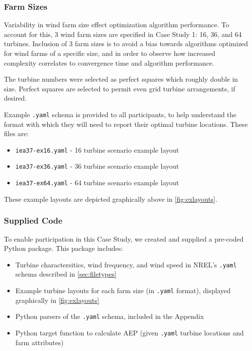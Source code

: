 	\subsubsection{Farm Sizes}
        Variability in wind farm size effect optimization algorithm performance.
        To account for this, 3 wind farm sizes are specified in Case Study 1: 16, 36, and 64 turbines.
        Inclusion of 3 farm sizes is to avoid a bias towards algorithms optimized for wind farms of a specific size, and in order to observe how increased complexity correlates to convergence time and algorithm performance.
        
        The turbine numbers were selected as perfect squares which roughly double in size.
        Perfect squares are selected to permit even grid turbine arrangements, if desired.

        Example \texttt{.yaml} schema is provided to all participants, to help understand the format with which they will need to report their optimal turbine locations.
        These files are:

        \begin{itemize}
            \item \texttt{iea37-ex16.yaml} - 16 turbine scenario example layout
            \item \texttt{iea37-ex36.yaml} - 36 turbine scenario example layout
            \item \texttt{iea37-ex64.yaml} - 64 turbine scenario example layout
        \end{itemize}

        \noindent These example layouts are depicted graphically above in \cref{fig:exlayouts}.
        
    \subsubsection{Supplied Code} \label{sec:code}

        To enable participation in this Case Study, we created and supplied a pre-coded Python package.
        This package includes:
            \begin{itemize}
                \item Turbine charactersitics, wind frequency, and wind speed in NREL's \texttt{.yaml} schema described in \cref{sec:filetypes}
                \item Example turbine layouts for each farm size (in \texttt{.yaml} format), displayed graphically in \cref{fig:exlayouts}
                \item Python parsers of the \texttt{.yaml} schema, included in the Appendix
                \item Python target function to calculate AEP (given \texttt{.yaml} turbine locations and farm attributes)
            \end{itemize}

